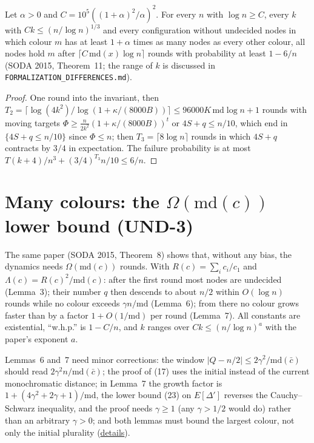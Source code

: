 \begin{theorem}\label{thm:plurality}
\leanok{}
Let $\alpha>0$ and $C=10^5((1+\alpha)^2/\alpha)^2$. For every $n$ with $\log n\ge C$, every $k$
with $Ck\le(n/\log n)^{1/3}$ and every configuration without undecided nodes in which colour $m$
has at least $1+\alpha$ times as many nodes as every other colour, all nodes hold $m$ after
$\lceil C\,\mathrm{md}(x)\log n\rceil$ rounds with probability at least $1-6/n$ (SODA 2015,
Theorem~11; the range of $k$ is discussed in \texttt{FORMALIZATION\_DIFFERENCES.md}).
\end{theorem}
\begin{proof}\leanok
One round into the invariant, then $T_2=\lceil\log(4k^2)/\log(1+\kappa/(8000B))\rceil\le
96000K\,\mathrm{md}\log n+1$ rounds with moving targets $\Phi\ge\frac n{2k^2}(1+\kappa/(8000B))^t$
or $4S+q\le n/10$, which end in $\{4S+q\le n/10\}$ since $\Phi\le n$; then
$T_3=\lceil 8\log n\rceil$ rounds in which $4S+q$ contracts by $3/4$ in expectation. The failure
probability is at most $T(k+4)/n^3+(3/4)^{T_3}n/10\le 6/n$.
\end{proof}

\section{Many colours: the \texorpdfstring{$\Omega(\mathrm{md}(c))$}{Omega(md(c))} lower bound (UND-3)}\label{sec:bcnps-lower-bound}
The same paper (SODA 2015, Theorem~8) shows that, without any bias, the dynamics needs
$\Omega(\mathrm{md}(c))$ rounds. With $R(c)=\sum_i c_i/c_1$ and $\Lambda(c)=R(c)^2/\mathrm{md}(c)$:
after the first round most nodes are undecided (Lemma~3); their number $q$ then descends to about
$n/2$ within $O(\log n)$ rounds while no colour exceeds $\gamma n/\mathrm{md}$ (Lemma~6); from
there no colour grows faster than by a factor $1+O(1/\mathrm{md})$ per round (Lemma~7). All
constants are existential, ``w.h.p.'' is $1-C/n$, and $k$ ranges over $Ck\le(n/\log n)^{a}$ with
the paper's exponent $a$.

Lemmas~6 and~7 need minor corrections: the window $|Q-n/2|\le 2\gamma^2/\mathrm{md}(\bar c)$ should
read $2\gamma^2n/\mathrm{md}(\bar c)$; the proof of (17) uses the initial instead of the current
monochromatic distance; in Lemma~7 the growth factor is $1+(4\gamma^2+2\gamma+1)/\mathrm{md}$, the
lower bound (23) on $E[\Delta']$ reverses the Cauchy--Schwarz inequality, and the proof needs
$\gamma\ge1$ (any $\gamma>1/2$ would do) rather than an arbitrary $\gamma>0$; and both lemmas must
bound the largest colour, not only the initial plurality
(\href{https://github.com/formal-dynamics/leanamics/blob/main/undecided/FORMALIZATION_DIFFERENCES.md#the-lower-bound-with-k-colours-lowerbound-roadmap-und-3}{details}).

